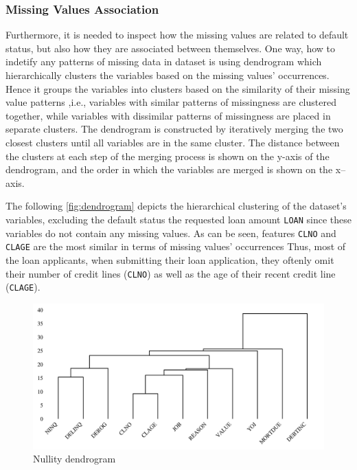 \subsubsection{Missing Values Association}
Furthermore, it is needed to inspect how the missing values are related to default status, but also how they are associated between themselves.
One way, how to indetify any patterns of missing data in dataset is using dendrogram which hierarchically clusters the variables based on the missing values' occurrences.
Hence it groups the variables into clusters based on the similarity of their missing value patterns ,i.e., variables with similar patterns of missingness are clustered together, while variables with dissimilar patterns of missingness are placed in separate clusters.
The dendrogram is constructed by iteratively merging the two closest clusters until all variables are in the same cluster.
The distance between the clusters at each step of the merging process is shown on the y-axis of the dendrogram, and the order in which the variables are merged is shown on the x--axis.

The following \autoref{fig:dendrogram} depicts the hierarchical clustering of the dataset's variables, excluding the default status the requested loan amount \texttt{LOAN} since these variables do not contain any missing values.
As can be seen, features \texttt{CLNO} and \texttt{CLAGE} are the most similar in terms of missing values' occurrences
Thus, most of the loan applicants, when submitting their loan application, they oftenly omit their number of credit lines (\texttt{CLNO}) as well as the age of their recent credit line (\texttt{CLAGE}).

    \begin{figure}[H]
        \centering
        \caption{Nullity dendrogram}\vspace{0.5em}
        \label{fig:dendrogram}
        \includegraphics[width=150mm]{Figures/NA_Dendrogram.jpg}
        \vspace{-1em}
    \end{figure}
    

